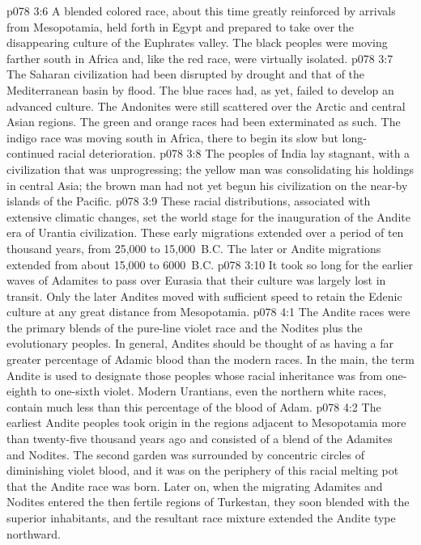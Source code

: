 \vs p078 3:6 A blended colored race, about this time greatly reinforced by arrivals from Mesopotamia, held forth in Egypt and prepared to take over the disappearing culture of the Euphrates valley. The black peoples were moving farther south in Africa and, like the red race, were virtually isolated.
\vs p078 3:7 The Saharan civilization had been disrupted by drought and that of the Mediterranean basin by flood. The blue races had, as yet, failed to develop an advanced culture. The Andonites were still scattered over the Arctic and central Asian regions. The green and orange races had been exterminated as such. The indigo race was moving south in Africa, there to begin its slow but long\hyp{}continued racial deterioration.
\vs p078 3:8 The peoples of India lay stagnant, with a civilization that was unprogressing; the yellow man was consolidating his holdings in central Asia; the brown man had not yet begun his civilization on the near\hyp{}by islands of the Pacific.
\pc \vs p078 3:9 These racial distributions, associated with extensive climatic changes, set the world stage for the inauguration of the Andite era of Urantia civilization. These early migrations extended over a period of ten thousand years, from 25,000 to 15,000~B.C. The later or Andite migrations extended from about 15,000 to 6000~B.C.
\vs p078 3:10 It took so long for the earlier waves of Adamites to pass over Eurasia that their culture was largely lost in transit. Only the later Andites moved with sufficient speed to retain the Edenic culture at any great distance from Mesopotamia.
\vs p078 4:1 The Andite races were the primary blends of the pure\hyp{}line violet race and the Nodites plus the evolutionary peoples. In general, Andites should be thought of as having a far greater percentage of Adamic blood than the modern races. In the main, the term Andite is used to designate those peoples whose racial inheritance was from one\hyp{}eighth to one\hyp{}sixth violet. Modern Urantians, even the northern white races, contain much less than this percentage of the blood of Adam.
\vs p078 4:2 The earliest Andite peoples took origin in the regions adjacent to Mesopotamia more than twenty\hyp{}five thousand years ago and consisted of a blend of the Adamites and Nodites. The second garden was surrounded by concentric circles of diminishing violet blood, and it was on the periphery of this racial melting pot that the Andite race was born. Later on, when the migrating Adamites and Nodites entered the then fertile regions of Turkestan, they soon blended with the superior inhabitants, and the resultant race mixture extended the Andite type northward.
